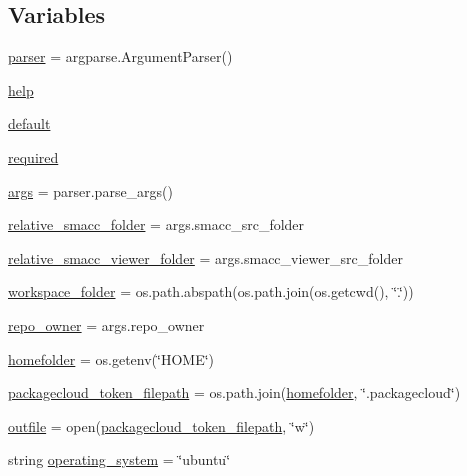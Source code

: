 \subsection*{Variables}
\begin{DoxyCompactItemize}
\item 
\hyperlink{namespacegenerate__debs_a4a9ae4bb85fc62d7973ea3d09ced6c26}{parser} = argparse.\+Argument\+Parser()
\item 
\hyperlink{namespacegenerate__debs_ab09f4294da5036d5f6881672de9ed9c7}{help}
\item 
\hyperlink{namespacegenerate__debs_a3d67a92b7eb3a59c397dc9fdd1c67558}{default}
\item 
\hyperlink{namespacegenerate__debs_a0199b8275e1bb7cf8a3355b264a5e305}{required}
\item 
\hyperlink{namespacegenerate__debs_a75f9143e38df82d83b2e8a6f99cae02c}{args} = parser.\+parse\+\_\+args()
\item 
\hyperlink{namespacegenerate__debs_abf6925bd06ac1da3981fe638eefb5a61}{relative\+\_\+smacc\+\_\+folder} = args.\+smacc\+\_\+src\+\_\+folder
\item 
\hyperlink{namespacegenerate__debs_a22d892b78adfce583710d78737eb4747}{relative\+\_\+smacc\+\_\+viewer\+\_\+folder} = args.\+smacc\+\_\+viewer\+\_\+src\+\_\+folder
\item 
\hyperlink{namespacegenerate__debs_acb69863b90257249a30e43ebacfb8bd8}{workspace\+\_\+folder} = os.\+path.\+abspath(os.\+path.\+join(os.\+getcwd(), \char`\"{}.\char`\"{}))
\item 
\hyperlink{namespacegenerate__debs_a23479dba5af50c90f3346b04d441ab2b}{repo\+\_\+owner} = args.\+repo\+\_\+owner
\item 
\hyperlink{namespacegenerate__debs_aeb83979be2939a8059435a906a91f682}{homefolder} = os.\+getenv(\char`\"{}H\+O\+ME\char`\"{})
\item 
\hyperlink{namespacegenerate__debs_a836a20b989c3c8e46255d91d10cb524f}{packagecloud\+\_\+token\+\_\+filepath} = os.\+path.\+join(\hyperlink{namespacegenerate__debs_aeb83979be2939a8059435a906a91f682}{homefolder}, \char`\"{}.packagecloud\char`\"{})
\item 
\hyperlink{namespacegenerate__debs_aa1faa039b35b72ee44dc6f106ad12911}{outfile} = open(\hyperlink{namespacegenerate__debs_a836a20b989c3c8e46255d91d10cb524f}{packagecloud\+\_\+token\+\_\+filepath}, \char`\"{}w\char`\"{})
\item 
string \hyperlink{namespacegenerate__debs_a162df833915546009650658683731f94}{operating\+\_\+system} = \char`\"{}ubuntu\char`\"{}

\end{DoxyCompactItemize}
